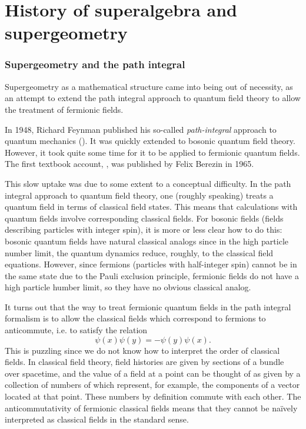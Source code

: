 \documentclass[a4paper,10pt]{scrreprt}
\theoremstyle{definition}
\theoremstyle{plain}
\theoremstyle{remark}
\begin{document}
\section{History of superalgebra and supergeometry} \label{sec:historyofsuperalgebraandsupergeometry}
\subsubsection{Supergeometry and the path integral} 
Supergeometry as a mathematical structure came into being out of necessity, as an attempt to extend the path integral approach to quantum field theory to allow the treatment of fermionic fields.

In 1948, Richard Feynman published his so-called \emph{path-integral} approach to quantum mechanics (\cite{feynmanpathintegral}). It was quickly extended to bosonic quantum field theory. However, it took quite some time for it to be applied to fermionic quantum fields. The first textbook account, \cite{berezinsecondquantization}, was published by Felix Berezin in 1965.

This slow uptake was due to some extent to a conceptual difficulty. In the path integral approach to quantum field theory, one (roughly speaking) treats a quantum field in terms of classical field states. This means that calculations with quantum fields involve corresponding classical fields. For bosonic fields (fields describing particles with integer spin), it is more or less clear how to do this: bosonic quantum fields have natural classical analogs since in the high particle number limit, the quantum dynamics reduce, roughly, to the classical field equations. However, since fermions (particles with half-integer spin) cannot be in the same state due to the Pauli exclusion principle, fermionic fields do not have a high particle humber limit, so they have no obvious classical analog.

It turns out that the way to treat fermionic quantum fields in the path integral formalism is to allow the classical fields which correspond to fermions to anticommute, i.e. to satisfy the relation 
\begin{equation*}
  \psi(x) \psi(y) = -\psi(y) \psi(x).
\end{equation*}
This is puzzling since we do not know how to interpret the order of classical fields. In classical field theory, field histories are given by sections of a bundle over spacetime, and the value of a field at a point can be thought of as given by a collection of numbers of which represent, for example, the components of a vector located at that point. These numbers by definition commute with each other. The anticommutativity of fermionic classical fields means that they cannot be na\"{i}vely interpreted as classical fields in the standard sense.
\end{document}
